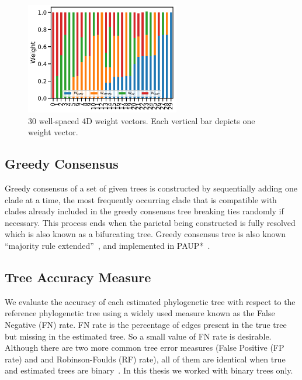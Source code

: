 \begin{figure}[!htbp]%
	\centering
	\includegraphics[width=0.6\textwidth]{Figure/30-4D-weight}
	\caption{30 well-spaced 4D weight vectors. Each vertical bar depicts one weight vector.}
	\label{fig:30-weights}
\end{figure}

\subsection{Greedy Consensus}

Greedy consensus of a set of given trees is constructed by sequentially
adding one clade at a time, the most frequently occurring clade that is compatible with clades already included
in the greedy consensus tree breaking ties randomly if necessary.
This process
ends when the parietal being constructed is fully resolved which is also known as a bifurcating tree. 
Greedy consensus tree is also known ``majority rule extended''~\cite{phylip}, and  implemented in PAUP*~\cite{swofford_paup*_2002}. 

\subsection{Tree Accuracy Measure} 
We evaluate the accuracy of each estimated phylogenetic tree with respect to the reference phylogenetic tree using a widely used measure known as the False Negative (FN) rate. FN rate is the percentage of edges present in the true tree but missing in the estimated tree. So a small value of FN rate is desirable. Although there are two more common tree error measures (False Positive (FP rate) and and Robinson-Foulds (RF) rate), all of them are identical when true and estimated trees are binary~\citep{warnow2017computational}. In this thesis we worked with binary trees only. %


